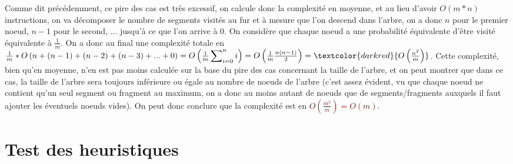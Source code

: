 \documentclass{article}
\newcommand{\red}[1]{\textcolor{darkred}{#1}}
\newcommand{\sumin}[3]{\sideset{}{_{i=#1}^{#2}}\sum{#3}}
\begin{document}
\noindent Comme dit précédemment, ce pire des cas est très excessif, on calcule donc la complexité en moyenne, et au lieu d'avoir $O(m*n)$ instructions, on va décomposer le 
nombre de segments visités au fur et à mesure que l'on descend dans l'arbre, on a donc $n$ pour le premier noeud, $n-1$ pour le second, ... jusqu'à ce que l'on arrive à $0$. On 
considère que chaque noeud a une probabilité équivalente d'être visité équivalente à $\frac{1}{m}$.
On a donc au final une complexité totale en $\frac{1}{m}*O\left(n+(n-1)+(n-2)+(n-3)+...+0\right) = O\left(\frac{1}{m}\sumin{0}{n}{i}\right) = O\left(\frac{1}{m}\frac{n(n-1)}
{2}\right) = \red{O\left(\frac{n^2}{m}\right)}$. Cette complexité, bien qu'en moyenne, n'en est pas moins calculée sur la base du pire des cas concernant la taille de l'arbre, et on 
peut montrer que dans ce cas, la taille de l'arbre sera toujours inférieure ou égale au nombre de noeuds de l'arbre (c'est assez évident, vu que chaque noeud ne contient qu'un seul 
segment ou fragment au maximum, on a donc au moins autant de noeuds que de segments/fragments auxquels il faut ajouter les éventuels noeuds vides). On peut donc conclure que 
la complexité est en \red{$O\left(\frac{m^2}{m}\right) = O(m)$}.

\newpage

\section{Test des heuristiques}
\end{document}
